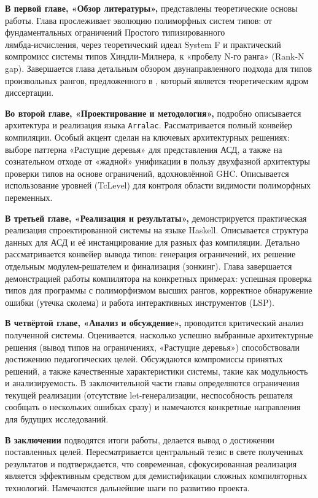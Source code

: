 \textbf{В первой главе, «Обзор литературы»,} представлены теоретические основы работы. Глава прослеживает эволюцию полиморфных систем типов: от фундаментальных ограничений Простого типизированного \\ лямбда-исчисления, через теоретический идеал System F и практический компромисс системы типов Хиндли-Милнера, к «пробелу N-го ранга» (Rank-N gap). Завершается глава детальным обзором двунаправленного подхода для типов произвольных рангов, предложенного в \cite{jones-practical-2007}, который является теоретическим ядром диссертации.

\textbf{Во второй главе, «Проектирование и методология»,} подробно описывается архитектура и реализация языка \texttt{Arralac}. Рассматривается полный конвейер компиляции. Особый акцент сделан на ключевых архитектурных решениях: выборе паттерна «Растущие деревья» для представления АСД, а также на сознательном отходе от «жадной» унификации в пользу двухфазной архитектуры проверки типов на основе ограничений, вдохновлённой GHC. Описывается использование уровней (TcLevel) для контроля области видимости полиморфных переменных.

\textbf{В третьей главе, «Реализация и результаты»,} демонстрируется практическая реализация спроектированной системы на языке Haskell. Описывается структура данных для АСД и её инстанцирование для разных фаз компиляции. Детально рассматривается конвейер вывода типов: генерация ограничений, их решение отдельным модулем-решателем и финализация (зонкинг). Глава завершается демонстрацией работы компилятора на конкретных примерах: успешная проверка типов для программы с полиморфизмом высших рангов, корректное обнаружение ошибки (утечка сколема) и работа интерактивных инструментов (LSP).

\textbf{В четвёртой главе, «Анализ и обсуждение»,} проводится критический анализ полученной системы. Оценивается, насколько успешно выбранные архитектурные решения (вывод типов на ограничениях, «Растущие деревья») способствовали достижению педагогических целей. Обсуждаются компромиссы принятых решений, а также качественные характеристики системы, такие как модульность и анализируемость. В заключительной части главы определяются ограничения текущей реализации (отсутствие let-генерализации, неспособность решателя сообщать о нескольких ошибках сразу) и намечаются конкретные направления для будущих исследований.

\textbf{В заключении} подводятся итоги работы, делается вывод о достижении поставленных целей. Пересматривается центральный тезис в свете полученных результатов и подтверждается, что современная, сфокусированная реализация является эффективным средством для демистификации сложных компиляторных технологий. Намечаются дальнейшие шаги по развитию проекта.